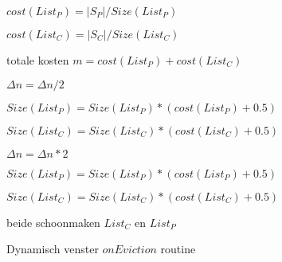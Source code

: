 \begin{algorithm}[htbp]
    \DontPrintSemicolon

    $cost(List_P) = |S_P| / Size(List_P)$      
    
    $cost(List_C) = |S_C| / Size(List_C)$     


    totale kosten $ m = cost(List_P) + cost(List_C)$  
  
    {
    
        $\Delta n = \Delta n / 2 $ 
        
        $Size(List_P) = Size(List_P) * (cost(List_P) + 0.5)$  

        $Size(List_C) = Size(List_C) * (cost(List_C) + 0.5)$  
    }
    {
   
        $\Delta n = \Delta n * 2$ 

        $Size(List_P) = Size(List_P) * (cost(List_P) + 0.5)$  

        $Size(List_C) = Size(List_C) * (cost(List_C) + 0.5)$  
    }

    beide schoonmaken $List_C \text{ en } List_P$
    \caption{Dynamisch venster $onEviction$ routine}
    \label{alg:dynamic_eviction}
\end{algorithm}



